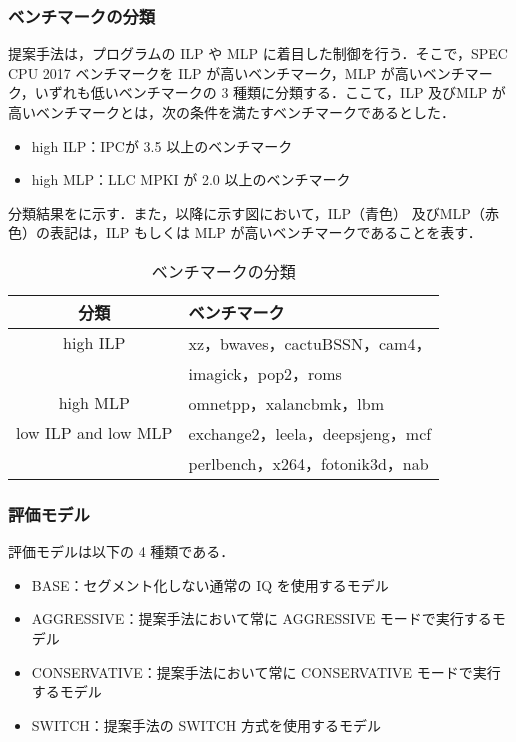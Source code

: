 \subsubsection{ベンチマークの分類}
提案手法は，プログラムの ILP や MLP に着目した制御を行う．そこで，SPEC CPU 2017 ベンチマークを ILP が高いベンチマーク，MLP が高いベンチマーク，いずれも低いベンチマークの 3 種類に分類する．ここて，ILP 及びMLP が高いベンチマークとは，次の条件を満たすベンチマークであるとした．
\begin{itemize}
  \item high ILP：IPCが 3.5 以上のベンチマーク
  \item high MLP：LLC MPKI が 2.0 以上のベンチマーク
\end{itemize}

分類結果をに示す．また，以降に示す図において，ILP（青色） 及びMLP（赤色）の表記は，ILP もしくは MLP が高いベンチマークであることを表す．
\begin{table}[htb]
  \caption{ベンチマークの分類}
  \footnotesize
  \center
    \begin{tabular}{c|l} \hline \hline
    分類 & ベンチマーク\\ \hline
    high ILP & xz，bwaves，cactuBSSN，cam4，\\
             & imagick，pop2，roms\\ \hline
    high MLP &  omnetpp，xalancbmk，lbm\\ \hline
    low ILP and low MLP & exchange2，leela，deepsjeng，mcf\\
                        & perlbench，x264，fotonik3d，nab \\ \hline
  \end{tabular}
  \label{tab:classification}
\end{table}

\subsubsection{評価モデル}
評価モデルは以下の 4 種類である．
\begin{itemize}
  \item BASE：セグメント化しない通常の IQ を使用するモデル
  \item AGGRESSIVE：提案手法において常に AGGRESSIVE モードで実行するモデル
  \item CONSERVATIVE：提案手法において常に CONSERVATIVE モードで実行するモデル
  \item SWITCH：提案手法の SWITCH 方式を使用するモデル 
\end{itemize}

